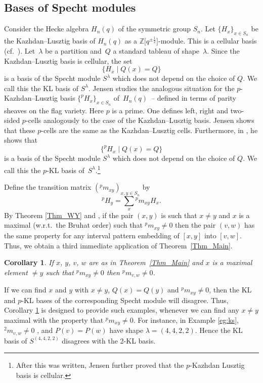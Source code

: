 \documentclass[10pt,a4paper]{amsart}
\numberwithin{equation}{section}
\newtheorem{Corollary}[Theorem]{Corollary}
\def\la{\lambda}
\begin{document}
\subsection{Bases of Specht modules}\label{sec:specht}

Consider the Hecke algebra $H_n(q)$ of the symmetric group $S_n$. Let $\{H_x\}_{x\in S_n}$ be the Kazhdan--Lusztig basis of $H_n(q)$ as a $\mathbb{Z}\big[q^{\pm \frac{1}{2}}\big]$-module.
This is a cellular basis (cf.\ \cite[Example~1.2]{grahamlehrer}). Let~$\la$ be a partition and~$Q$ a standard tableau of shape~$\la$. Since the Kazhdan--Lusztig basis is cellular, the set
\[
\{H_x\mid Q(x)=Q\}
\]
is a basis of the Specht module $S^\la$ which does not depend on the choice of $Q$. We call this the KL basis of $S^\lambda$.
Jensen \cite{thorge} studies the analogous situation for the $p$-Kazhdan--Lusztig basis $\{^pH_x\}_{x\in S_n}$ of~$H_n(q)$~-- defined in terms of parity sheaves on the flag variety. Here $p$ is a prime. One defines left, right and two-sided $p$-cells analogously to the case of the Kazhdan--Lusztig basis. Jensen \cite[Theorem~4.33]{thorge} shows that these $p$-cells are the same as the Kazhdan--Lusztig cells. Furthermore, in \cite[Corollary~4.39]{thorge}, he shows that
\[
\{^pH_x\mid Q(x)=Q\}
\]
is a basis of the Specht module $S^\la$ which does not depend on the choice of $Q$. We call this the $p$-KL basis of~$S^\lambda$.\footnote{After this was written, Jensen \cite{jensencellular} further proved that the $p$-Kazhdan Lusztig basis is cellular.}

Define the transition matrix $(^pm_{xy})_{x,y\in S_n}$ by
\[
^pH_y = \sum_x {}^pm_{xy} H_x.
\]
By Theorem \ref{Thm_WY} and \cite[Theorem 3.7]{williamson14}, if the pair $(x,y)$ is such that $x\neq y$ and $x$ is a maximal (w.r.t.\ the Bruhat order) such that ${}^pm_{xy}\neq 0$ then the pair $(v,w)$ has the same property for any interval pattern embedding of $[x,y]$ into $[v,w]$.
Thus, we obtain a third immediate application of Theorem~\ref{Thm_Main}.

\begin{Corollary}\label{Cor_Specht}
If $x$, $y$, $v$, $w$ are as in Theorem~{\rm \ref{Thm_Main}} and $x$ is a maximal element $\neq y$ such that ${}^pm_{xy}\neq 0$ then ${}^pm_{v,w}\neq 0$.
\end{Corollary}
If we can find $x$ and $y$ with $x\neq y$, $Q(x)=Q(y)$ and $^pm_{xy}\neq 0$, then the KL and $p$-KL bases of the corresponding Specht module will disagree. Thus, Corollary \ref{Cor_Specht} is designed to provide such examples, whenever we can find any $x\neq y$ maximal with the property that $^pm_{xy}\neq 0$. For instance, in Example \ref{eg:ks}, $^2m_{v,w}\neq 0$ \cite[Section~5.6]{thorgegeordie}, and $P(v)=P(w)$ have shape $\lambda=(4,4,2,2)$. Hence the KL basis of $S^{(4,4,2,2)}$ disagrees with the 2-KL basis.
\end{document}
